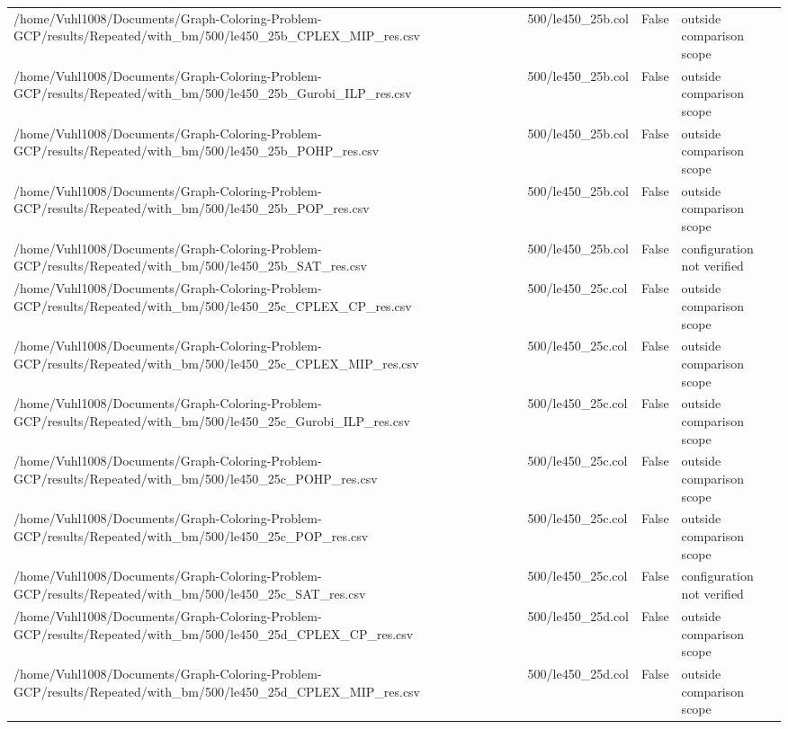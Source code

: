 \begin{table}[htbp]
\begin{tabular}{llll}
/home/Vuhl1008/Documents/Graph-Coloring-Problem-GCP/results/Repeated/with\_bm/500/le450\_25b\_CPLEX\_MIP\_res.csv & 500/le450\_25b.col & False & outside comparison scope \\
/home/Vuhl1008/Documents/Graph-Coloring-Problem-GCP/results/Repeated/with\_bm/500/le450\_25b\_Gurobi\_ILP\_res.csv & 500/le450\_25b.col & False & outside comparison scope \\
/home/Vuhl1008/Documents/Graph-Coloring-Problem-GCP/results/Repeated/with\_bm/500/le450\_25b\_POHP\_res.csv & 500/le450\_25b.col & False & outside comparison scope \\
/home/Vuhl1008/Documents/Graph-Coloring-Problem-GCP/results/Repeated/with\_bm/500/le450\_25b\_POP\_res.csv & 500/le450\_25b.col & False & outside comparison scope \\
/home/Vuhl1008/Documents/Graph-Coloring-Problem-GCP/results/Repeated/with\_bm/500/le450\_25b\_SAT\_res.csv & 500/le450\_25b.col & False & configuration not verified \\
/home/Vuhl1008/Documents/Graph-Coloring-Problem-GCP/results/Repeated/with\_bm/500/le450\_25c\_CPLEX\_CP\_res.csv & 500/le450\_25c.col & False & outside comparison scope \\
/home/Vuhl1008/Documents/Graph-Coloring-Problem-GCP/results/Repeated/with\_bm/500/le450\_25c\_CPLEX\_MIP\_res.csv & 500/le450\_25c.col & False & outside comparison scope \\
/home/Vuhl1008/Documents/Graph-Coloring-Problem-GCP/results/Repeated/with\_bm/500/le450\_25c\_Gurobi\_ILP\_res.csv & 500/le450\_25c.col & False & outside comparison scope \\
/home/Vuhl1008/Documents/Graph-Coloring-Problem-GCP/results/Repeated/with\_bm/500/le450\_25c\_POHP\_res.csv & 500/le450\_25c.col & False & outside comparison scope \\
/home/Vuhl1008/Documents/Graph-Coloring-Problem-GCP/results/Repeated/with\_bm/500/le450\_25c\_POP\_res.csv & 500/le450\_25c.col & False & outside comparison scope \\
/home/Vuhl1008/Documents/Graph-Coloring-Problem-GCP/results/Repeated/with\_bm/500/le450\_25c\_SAT\_res.csv & 500/le450\_25c.col & False & configuration not verified \\
/home/Vuhl1008/Documents/Graph-Coloring-Problem-GCP/results/Repeated/with\_bm/500/le450\_25d\_CPLEX\_CP\_res.csv & 500/le450\_25d.col & False & outside comparison scope \\
/home/Vuhl1008/Documents/Graph-Coloring-Problem-GCP/results/Repeated/with\_bm/500/le450\_25d\_CPLEX\_MIP\_res.csv & 500/le450\_25d.col & False & outside comparison scope \\

\end{tabular}
\end{table}
